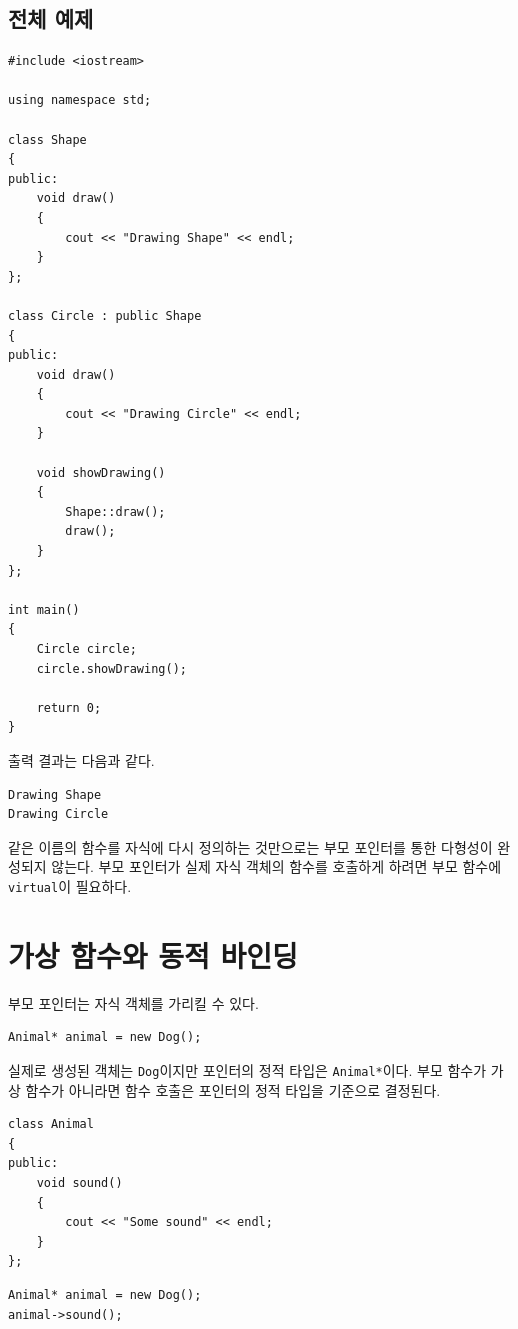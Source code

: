 \documentclass[11pt,a4paper]{article}
\begin{document}
\subsection{전체 예제}
\begin{lstlisting}
#include <iostream>

using namespace std;

class Shape
{
public:
    void draw()
    {
        cout << "Drawing Shape" << endl;
    }
};

class Circle : public Shape
{
public:
    void draw()
    {
        cout << "Drawing Circle" << endl;
    }

    void showDrawing()
    {
        Shape::draw();
        draw();
    }
};

int main()
{
    Circle circle;
    circle.showDrawing();

    return 0;
}
\end{lstlisting}

출력 결과는 다음과 같다.

\begin{verbatim}
Drawing Shape
Drawing Circle
\end{verbatim}

\begin{importantbox}
같은 이름의 함수를 자식에 다시 정의하는 것만으로는 부모 포인터를 통한 다형성이 완성되지 않는다. 부모 포인터가 실제 자식 객체의 함수를 호출하게 하려면 부모 함수에 \texttt{virtual}이 필요하다.
\end{importantbox}

\section{가상 함수와 동적 바인딩}
부모 포인터는 자식 객체를 가리킬 수 있다.

\begin{lstlisting}
Animal* animal = new Dog();
\end{lstlisting}

실제로 생성된 객체는 \texttt{Dog}이지만 포인터의 정적 타입은 \texttt{Animal*}이다. 부모 함수가 가상 함수가 아니라면 함수 호출은 포인터의 정적 타입을 기준으로 결정된다.

\begin{lstlisting}
class Animal
{
public:
    void sound()
    {
        cout << "Some sound" << endl;
    }
};
\end{lstlisting}

\begin{lstlisting}
Animal* animal = new Dog();
animal->sound();
\end{lstlisting}
\end{document}
